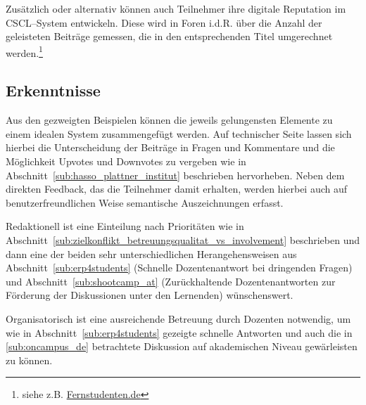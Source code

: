 Zusätzlich oder alternativ können auch Teilnehmer ihre digitale Reputation im \ac{CSCL}–System entwickeln. Diese wird in Foren i.d.R. über die Anzahl der geleisteten Beiträge gemessen, die in den entsprechenden Titel umgerechnet werden.\footnote{siehe z.B. \url{Fernstudenten.de}}

\subsection{Erkenntnisse} %
\label{sub:erkenntnisse}
Aus den gezweigten Beispielen können die jeweils gelungensten Elemente zu einem idealen System zusammengefügt werden. Auf technischer Seite lassen sich hierbei die Unterscheidung der Beiträge in Fragen und Kommentare und die Möglichkeit Upvotes und Downvotes zu vergeben wie in Abschnitt~\ref{sub:hasso_plattner_institut} beschrieben hervorheben. Neben dem direkten Feedback, das die Teilnehmer damit erhalten, werden hierbei auch auf benutzerfreundlichen Weise semantische Auszeichnungen erfasst. 

Redaktionell ist eine Einteilung nach Prioritäten wie in Abschnitt~\ref{sub:zielkonflikt_betreuungsqualitat_vs_involvement} beschrieben und dann eine der beiden sehr unterschiedlichen Herangehensweisen aus Abschnitt~\ref{sub:erp4students} (Schnelle Dozentenantwort bei dringenden Fragen) und Abschnitt~\ref{sub:shootcamp_at} (Zurückhaltende Dozentenantworten zur Förderung der Diskussionen unter den Lernenden) wünschenswert.

Organisatorisch ist eine ausreichende Betreuung durch Dozenten notwendig, um wie in Abschnitt~\ref{sub:erp4students} gezeigte schnelle Antworten und auch die in \ref{sub:oncampus_de} betrachtete Diskussion auf akademischen Niveau gewärleisten zu können.

